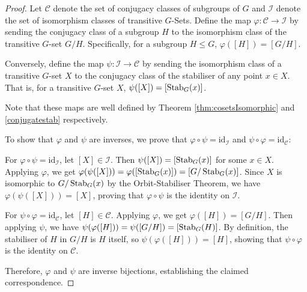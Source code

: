 \begin{proof}
Let $\mathcal{C}$ denote the set of conjugacy classes of subgroups of
$G$ and $\mathcal{I}$ denote the set of isomorphism classes of transitive $G$-Sets.
Define the map $\varphi: \mathcal{C} \rightarrow \mathcal{I}$ by sending the conjugacy class of a subgroup $H$ to the isomorphism class of the transitive $G$-set $G/H$. Specifically, for a subgroup $H \leq G$, $\varphi([H]) = [G/H]$.

Conversely, define the map $\psi: \mathcal{I} \rightarrow \mathcal{C}$ by sending the isomorphism class of a transitive $G$-set $X$ to the conjugacy class of the stabiliser of any point $x \in X$. That is, for a transitive $G$-set $X$, $\psi([X]) = [\operatorname*{Stab}_G(x)]$.

Note that these maps are well defined by Theorem \ref{thm:cosetsIsomorphic} and \ref{conjugatestab} respectively.

To show that $\varphi$ and $\psi$ are inverses, we prove that $\varphi \circ \psi = \text{id}_{\mathcal{I}}$ and $\psi \circ \varphi = \text{id}_{\mathcal{C}}$:

For $\varphi \circ \psi = \text{id}_{\mathcal{I}}$,
let $[X] \in \mathcal{I}$. Then $\psi([X]) = [\operatorname*{Stab}_G(x)]$ for some $x \in X$. Applying $\varphi$, we get $\varphi(\psi([X])) = \varphi([\operatorname*{Stab}_G(x)]) = [G/\operatorname*{Stab}_G(x)]$. Since $X$ is isomorphic to $G/\operatorname*{Stab}_G(x)$ by the Orbit-Stabiliser Theorem, we have $\varphi(\psi([X])) = [X]$, proving that $\varphi \circ \psi$ is the identity on $\mathcal{I}$.

For $\psi \circ \varphi = \text{id}_{\mathcal{C}}$,
let $[H] \in \mathcal{C}$. Applying $\varphi$, we get $\varphi([H]) = [G/H]$. Then applying $\psi$, we have $\psi(\varphi([H])) = \psi([G/H]) = [\operatorname*{Stab}_G(H)]$. By definition, the stabiliser of $H$ in $G/H$ is $H$ itself, so $\psi(\varphi([H])) = [H]$, showing that $\psi \circ \varphi$ is the identity on $\mathcal{C}$.

Therefore, $\varphi$ and $\psi$ are inverse bijections, establishing the claimed correspondence.
\end{proof}
